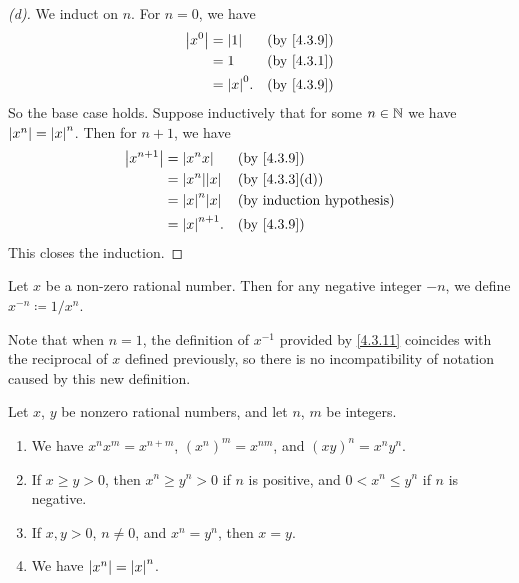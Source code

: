 \begin{proof}[(d)]
  We induct on \(n\).
  For \(n = 0\), we have
  \begin{align*}
    \abs{x^0} & = \abs{1}    &  & \by{4.3.9} \\
              & = 1          &  & \by{4.3.1} \\
              & = \abs{x}^0. &  & \by{4.3.9}
  \end{align*}
  So the base case holds.
  Suppose inductively that for some \(n \in \mathbb{N}\) we have \(\left\lvert x^n\right\rvert = \left\lvert x\right\rvert^n\).
  Then for \(n + 1\), we have
  \begin{align*}
    \abs{x^{n + 1}} & = \abs{x^n x}       &  & \by{4.3.9}    \\
                    & = \abs{x^n} \abs{x} &  & \by{4.3.3}[d] \\
                    & = \abs{x}^n \abs{x} &  & \byIH         \\
                    & = \abs{x}^{n + 1}.  &  & \by{4.3.9}
  \end{align*}
  This closes the induction.
\end{proof}

\begin{defn}\label{4.3.11}
  Let \(x\) be a non-zero rational number.
  Then for any negative integer \(-n\), we define \(x^{-n} \coloneqq 1 / x^n\).

  Note that when \(n = 1\), the definition of \(x^{-1}\) provided by \cref{4.3.11} coincides with the reciprocal of \(x\) defined previously, so there is no incompatibility of notation caused by this new definition.
\end{defn}

\begin{prop}\label{4.3.12}
  Let \(x\), \(y\) be nonzero rational numbers, and let \(n\), \(m\) be integers.
  \begin{enumerate}
    \item We have \(x^n x^m = x^{n + m}\), \((x^n)^m = x^{nm}\), and \((xy)^n = x^n y^n\).
    \item If \(x \geq y > 0\), then \(x^n \geq y^n > 0\) if \(n\) is positive, and \(0 < x^n \leq y^n\) if \(n\) is negative.
    \item If \(x, y > 0\), \(n \neq 0\), and \(x^n = y^n\), then \(x = y\).
    \item We have \(\left\lvert x^n\right\rvert = \left\lvert x\right\rvert^n\).
  \end{enumerate}
\end{prop}

